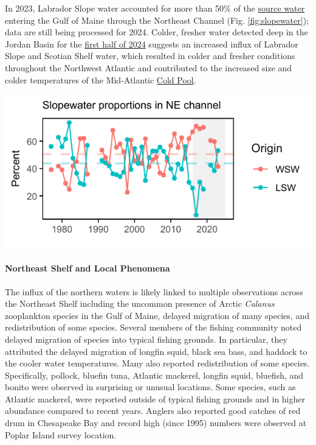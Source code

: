 \documentclass[
  10pt,
]{article}
\let\origfigure\figure
\let\endorigfigure\endfigure
\renewenvironment{figure}[1][2] {
    \expandafter\origfigure\expandafter[H]
} {
    \endorigfigure
}
\begin{document}
In 2023, Labrador Slope water accounted for more than 50\% of the \href{https://noaa-edab.github.io/catalog/slopewater.html}{source water} entering the Gulf of Maine through the Northeast Channel (Fig. \ref{fig:slopewater}); data are still being processed for 2024. Colder, fresher water detected deep in the Jordan Basin for the \href{https://noaa-edab.github.io/catalog/observation_synthesis_2024.html}{first half of 2024} suggests an increased influx of Labrador Slope and Scotian Shelf water, which resulted in colder and fresher conditions throughout the Northwest Atlantic and contributed to the increased size and colder temperatures of the Mid-Atlantic \href{https://noaa-edab.github.io/catalog/cold_pool.html}{Cold Pool}.

\begin{figure}

{\centering \includegraphics{midatlantic_files/figure-latex/slopewater-1} 

}

\caption{The proportion of Warm Slope Water (WSW) and Labrador Slope Water (LSW) enter the Gulf of Maine through the Northeast Channel. The orange and teal dashed lines represent the long-term proportion averages for the WSW and LSW respectively.}\label{fig:slopewater}
\end{figure}

\paragraph{Northeast Shelf and Local Phenomena}\label{northeast-shelf-and-local-phenomena}

The influx of the northern waters is likely linked to multiple observations across the Northeast Shelf including the uncommon presence of Arctic \emph{Calanus} zooplankton species in the Gulf of Maine, delayed migration of many species, and redistribution of some species. Several members of the fishing community noted delayed migration of species into typical fishing grounds. In particular, they attributed the delayed migration of longfin squid, black sea bass, and haddock to the cooler water temperatures. Many also reported redistribution of some species. Specifically, pollock, bluefin tuna, Atlantic mackerel, longfin squid, bluefish, and bonito were observed in surprising or unusual locations. Some species, such as Atlantic mackerel, were reported outside of typical fishing grounds and in higher abundance compared to recent years. Anglers also reported good catches of red drum in Chesapeake Bay and record high (since 1995) numbers were observed at Poplar Island survey location.
\end{document}
